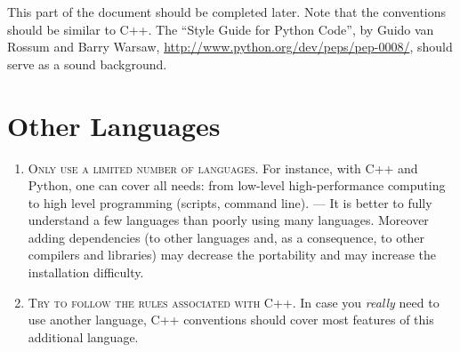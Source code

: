 \documentclass{tufte-book}
\newcounter{points}
\renewcommand{\rule}[1]{\textsc{#1}}
\newcommand{\commentcs}[1]{\newline #1}
\newcommand{\justification}[1]{\newline {\it Justification} --- #1}
\newenvironment{cenumerate}
{
  \begin{enumerate}\setcounter{enumi}{\value{points}}%
  }
  {
    \setcounter{points}{\value{enumi}}\end{enumerate}
}
\begin{document}
This part of the document should be completed later. Note that the conventions
should be similar to C++. The ``Style Guide for Python Code'', by Guido van
Rossum and Barry Warsaw, \url{http://www.python.org/dev/peps/pep-0008/},
should serve as a sound background.




\section{Other Languages}

\begin{cenumerate}
\item \rule{Only use a limited number of languages.} \commentcs{For instance,
    with C++ and Python, one can cover all needs: from low-level
    high-performance computing to high level programming (scripts, command
    line).}  \justification{It is better to fully understand a few languages
    than poorly using many languages. Moreover adding dependencies (to other
    languages and, as a consequence, to other compilers and libraries) may
    decrease the portability and may increase the installation difficulty.}
\item \rule{Try to follow the rules associated with C++.} \commentcs{In case you
    {\it really} need to use another language, C++ conventions should cover
    most features of this additional language.}
\end{cenumerate}






\end{document}
